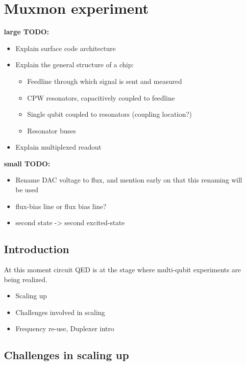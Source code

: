 

\part{Muxmon experiment}

  \textbf{large TODO:}
  \begin{itemize}
    \item Explain surface code architecture
    \item Explain the general structure of a chip:
    \begin{itemize}
      \item Feedline through which signal is sent and measured
      \item CPW resonators, capacitively coupled to feedline
      \item Single qubit coupled to resonators (coupling location?)
      \item Resonator buses
    \end{itemize}
    \item Explain multiplexed readout
  \end{itemize}

  \textbf{small TODO:}
  \begin{itemize}
    \item Rename DAC voltage to flux, and mention early on that this renaming will be used
    \item flux-bias line or flux bias line?
    \item second state -> second excited-state
  \end{itemize}



  \chapter*{Introduction}

    At this moment circuit QED is at the stage where multi-qubit experiments are being realized.

    \begin{itemize}
        \item Scaling up
        \item Challenges involved in scaling
        \item Frequency re-use, Duplexer intro
    \end{itemize}


  \chapter{Challenges in scaling up}
    \label{ch:Muxmon chip architecture}

